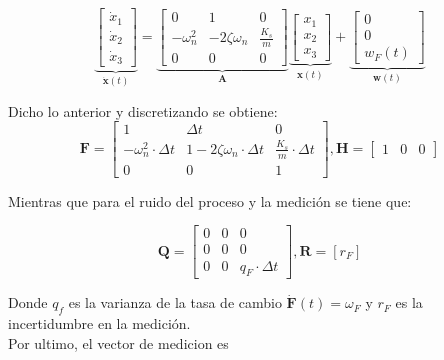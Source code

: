 \documentclass[conference]{IEEEtran}
\begin{document}
\begin{equation*}
	\underbrace{
		\begin{bmatrix}
			\dot{x}_1 \\
			\dot{x}_2 \\
			\dot{x}_3
		\end{bmatrix}
	}_{\mathbf{\dot{x}}(t)}
	=
	\underbrace{\begin{bmatrix}
			0           & 1                & 0 \\
			-\omega_n^2 & -2\zeta\omega_n  &  \frac{K_s}{m} \\
			0			& 0				   & 0
	\end{bmatrix}}_{\mathbf{A}}
	\underbrace{\begin{bmatrix}
			x_1 \\
			x_2 \\
			x_3
	\end{bmatrix}}_{\mathbf{x}(t)}	
	+
	\underbrace{
	\begin{bmatrix}
		0 \\
		0 \\
		w_{F}(t)
	\end{bmatrix}
	}_{\mathbf{w}(t)}	
\end{equation*}

Dicho lo anterior y discretizando se obtiene:
\[
\mathbf{F} = 
\begin{bmatrix}
	1           & \Delta t            & 0 \\
	-\omega_n^2 \cdot \Delta t   & 1 -2\zeta\omega_n \cdot \Delta t   &  \frac{K_s}{m} \cdot \Delta t  \\
	0			& 0				   & 1
\end{bmatrix}, 
\mathbf{H} = 
\begin{bmatrix}
	1 & 0 & 0
\end{bmatrix}
\]


Mientras que para el ruido del proceso y la medición se tiene que:


\[
\mathbf{Q} =  \begin{bmatrix}
	0   & 0    & 0 \\
	0   & 0    & 0  \\
	0   & 0	   & q_F \cdot \Delta t
\end{bmatrix}, \mathbf{R} = [r_F]
\]

Donde $q_f$ es la varianza de la tasa de cambio $\mathbf{\dot{F}}(t) = \omega_{F}$ y $r_F$ es la incertidumbre en la medici\'on.\\

Por ultimo, el vector de medicion es
\end{document}
